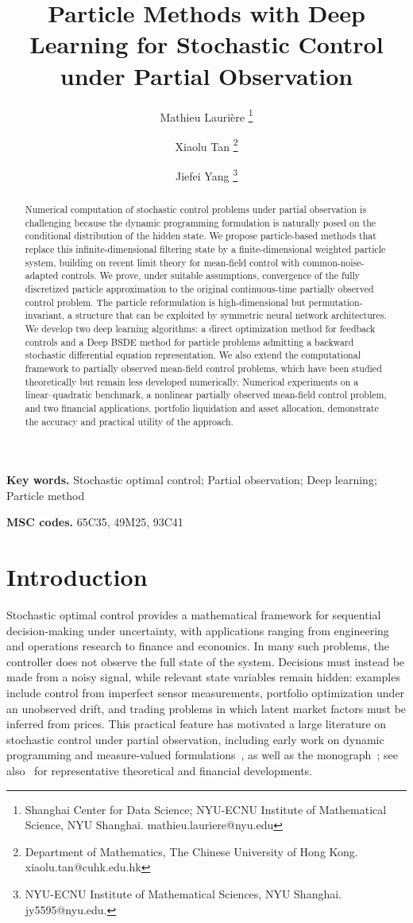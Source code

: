 \documentclass[11pt]{article}
\title{Particle Methods with Deep Learning for Stochastic Control \\ under Partial Observation}
\author{Mathieu Lauri\`{e}re \thanks{Shanghai Center for Data Science; NYU-ECNU Institute of Mathematical Science, NYU Shanghai. mathieu.lauriere@nyu.edu}
	\and Xiaolu Tan \thanks{Department of Mathematics, The Chinese University of Hong Kong. xiaolu.tan@cuhk.edu.hk}
	\and Jiefei Yang \thanks{NYU-ECNU Institute of Mathematical Sciences, NYU Shanghai. jy5595@nyu.edu.}
}
\date{}
\numberwithin{equation}{section}
\theoremstyle{plain}
\theoremstyle{definition}
\theoremstyle{remark}
\begin{document}
	
	\maketitle
	
	\begin{abstract}
				Numerical computation of stochastic control problems under partial observation is challenging because the dynamic programming formulation is naturally posed on the conditional distribution of the hidden state. We propose particle-based methods that replace this infinite-dimensional filtering state by a finite-dimensional weighted particle system, building on recent limit theory for mean-field control with common-noise-adapted controls. We prove, under suitable assumptions, convergence of the fully discretized particle approximation to the original continuous-time partially observed control problem. The particle reformulation is high-dimensional but permutation-invariant, a structure that can be exploited by symmetric neural network architectures. We develop two deep learning algorithms: a direct optimization method for feedback controls and a Deep BSDE method for particle problems admitting a backward stochastic differential equation representation. We also extend the computational framework to partially observed mean-field control problems, which have been studied theoretically but remain less developed numerically. Numerical experiments on a linear--quadratic benchmark, a nonlinear partially observed mean-field control problem, and two financial applications, portfolio liquidation and asset allocation, demonstrate the accuracy and practical utility of the approach. 
	\end{abstract}

    {\bf Key words.} Stochastic optimal control; Partial observation; Deep learning; Particle method
    
    {\bf MSC codes.} 65C35, 49M25, 93C41
	
	\section{Introduction}
	Stochastic optimal control provides a mathematical framework for sequential decision-making under uncertainty, with applications ranging from engineering and operations research to finance and economics. In many such problems, the controller does not observe the full state of the system. Decisions must instead be made from a noisy signal, while relevant state variables remain hidden: examples include control from imperfect sensor measurements, portfolio optimization under an unobserved drift, and trading problems in which latent market factors must be inferred from prices. This practical feature has motivated a large literature on stochastic control under partial observation, including early work on dynamic programming and measure-valued formulations~\cite{davis1973dynamic, fleming1980measure}, as well as the monograph~\cite{bensoussan1992stochastic}; see also~\cite{bensoussan1985optimal, pham2008portfolio, balata2019class} for representative theoretical and financial developments.
	
\end{document}
